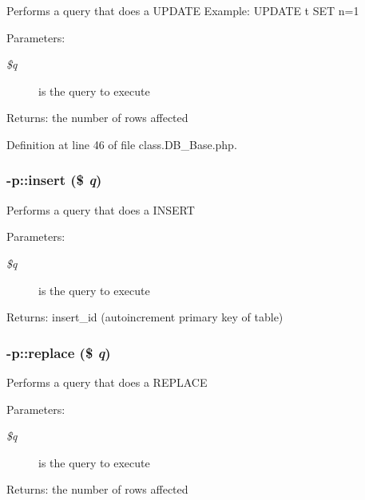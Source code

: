 Performs a query that does a UPDATE Example: UPDATE t SET n=1 \begin{Desc}
\item[Parameters:]
\begin{description}
\item[{\em \$q}]is the query to execute \end{description}
\end{Desc}
\begin{Desc}
\item[Returns:]the number of rows affected \end{Desc}


Definition at line 46 of file class.DB\_\-Base.php.
\subsubsection{-p::insert (\$ {\em q})\hspace{0.3cm}{\tt  [abstract]}}\label{protocolDB__Base-p_e757644b91b100f945d8862940b049cd}


Performs a query that does a INSERT \begin{Desc}
\item[Parameters:]
\begin{description}
\item[{\em \$q}]is the query to execute \end{description}
\end{Desc}
\begin{Desc}
\item[Returns:]insert\_\-id (autoincrement primary key of table) \end{Desc}
\subsubsection{-p::replace (\$ {\em q})}\label{protocolDB__Base-p_9828857699ad358a6057e8f34f5a0f49}


Performs a query that does a REPLACE \begin{Desc}
\item[Parameters:]
\begin{description}
\item[{\em \$q}]is the query to execute \end{description}
\end{Desc}
\begin{Desc}
\item[Returns:]the number of rows affected \end{Desc}


